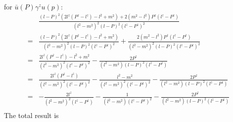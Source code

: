 \documentclass{article}
\begin{document}
for $\bar u(P)\gamma^zu(p)$:
\begin{align*}
	  & \frac{(l-P)^2 \left(2 l^z \left(P^z-l^z\right)-l^2+m^2\right)+2 \left(m^2-l^2\right) P^z \left(l^z-P^z\right)}{\left(l^2-m^2\right)^2(l-P)^2 \left(l^z-P^z\right)^2} \\
	= & \frac{(l-P)^2 \left(2 l^z \left(P^z-l^z\right)-l^2+m^2\right)}{\left(l^2-m^2\right)^2(l-P)^2 \left(l^z-P^z\right)^2}
	+\frac{2 \left(m^2-l^2\right) P^z \left(l^z-P^z\right)}{\left(l^2-m^2\right)^2(l-P)^2 \left(l^z-P^z\right)^2}\\
	= & \frac{ 2 l^z \left(P^z-l^z\right)-l^2+m^2}{\left(l^2-m^2\right)^2 \left(l^z-P^z\right)^2}
	-\frac{2  P^z }{\left(l^2-m^2\right)(l-P)^2 \left(l^z-P^z\right)}\\
	= & \frac{ 2 l^z \left(P^z-l^z\right)}{\left(l^2-m^2\right)^2 \left(l^z-P^z\right)^2}
	-\frac{l^2-m^2}{\left(l^2-m^2\right)^2 \left(l^z-P^z\right)^2}
	-\frac{2  P^z }{\left(l^2-m^2\right)(l-P)^2 \left(l^z-P^z\right)}\\
	= & -\frac{ 2 l^z }{\left(l^2-m^2\right)^2 \left(l^z-P^z\right)}
	-\frac{1}{\left(l^2-m^2\right) \left(l^z-P^z\right)^2}
	-\frac{2  P^z }{\left(l^2-m^2\right)(l-P)^2 \left(l^z-P^z\right)}\\
\end{align*}
The total result is
\end{document}
